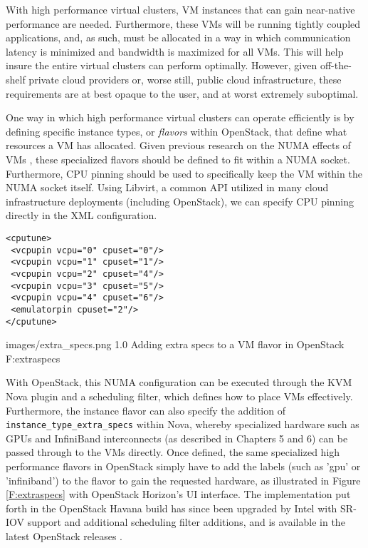 With high performance virtual clusters, VM instances that can gain near-native performance are needed. Furthermore, these VMs will be running tightly coupled applications, and, as such, must be allocated in a way in which communication latency is minimized and bandwidth is maximized for all VMs. This will help insure the entire virtual clusters can perform optimally.  However, given off-the-shelf private cloud providers or, worse still, public cloud infrastructure, these requirements are at best opaque to the user, and at worst extremely suboptimal.

One way in which high performance virtual clusters can operate efficiently is by defining specific instance types, or \emph{flavors} within OpenStack, that define what resources a VM has allocated.  Given previous research on the NUMA effects of VMs \cite{openstack-numa}, these specialized flavors should be defined to fit within a NUMA socket.  Furthermore, CPU pinning should be used to specifically keep the VM within the NUMA socket itself.  Using Libvirt, a common API utilized in many cloud infrastructure deployments (including OpenStack), we can specify CPU pinning directly in the XML configuration.

\begin{verbatim}
<cputune>
 <vcpupin vcpu="0" cpuset="0"/>
 <vcpupin vcpu="1" cpuset="1"/>
 <vcpupin vcpu="2" cpuset="4"/>
 <vcpupin vcpu="3" cpuset="5"/>
 <vcpupin vcpu="4" cpuset="6"/>
 <emulatorpin cpuset="2"/>
</cputune>
\end{verbatim}

  {images/extra_specs.png}
  {1.0}
  {Adding extra specs to a VM flavor in OpenStack}
  {F:extraspecs}

With OpenStack, this NUMA configuration can be executed through the KVM Nova plugin and a scheduling filter, which defines how to place VMs effectively. Furthermore, the instance flavor can also specify the addition of \verb!instance_type_extra_specs! within Nova, whereby specialized hardware such as GPUs and InfiniBand interconnects (as described in Chapters 5 and 6) can be passed through to the VMs directly. Once defined, the same specialized high performance flavors in OpenStack simply have to add the labels (such as 'gpu' or 'infiniband') to the flavor to gain the requested hardware, as illustrated in Figure \ref{F:extraspecs} with OpenStack Horizon's UI interface.  The implementation put forth in the OpenStack Havana build has since been upgraded by Intel with SR-IOV support and additional scheduling filter additions, and is available in the latest OpenStack releases \cite{jiang2015}. 

